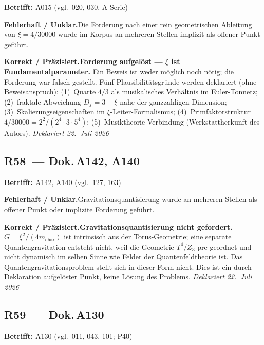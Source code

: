 \noindent\textbf{Betrifft:} A015 (vgl.\ 020, 030, A-Serie)


\smallskip\noindent\textbf{Fehlerhaft / Unklar.}\quad Die Forderung nach einer rein geometrischen Ableitung von $\xi=4/30000$ wurde im Korpus an mehreren Stellen implizit als offener Punkt geführt.


\smallskip\noindent\textbf{Korrekt / Präzisiert.}\quad \textbf{Forderung aufgelöst --- $\xi$ ist Fundamentalparameter.} Ein Beweis ist weder möglich noch nötig; die Forderung war falsch gestellt. Fünf Plausibilitätsgründe werden deklariert (ohne Beweisanspruch): (1)~Quarte $4/3$ als musikalisches Verhältnis im Euler-Tonnetz; (2)~fraktale Abweichung $D_f=3-\xi$ nahe der ganzzahligen Dimension; (3)~Skalierungseigenschaften im $\xi$-Leiter-Formalismus; (4)~Primfaktorstruktur $4/30000 = 2^2/(2^4\cdot 3\cdot 5^4)$; (5)~Musiktheorie-Verbindung (Werkstattherkunft des Autors). \emph{Deklariert 22.~Juli 2026}


\medskip


\subsection*{R58~--- Dok.\,A142, A140}

\noindent\textbf{Betrifft:} A142, A140 (vgl.\ 127, 163)


\smallskip\noindent\textbf{Fehlerhaft / Unklar.}\quad Gravitationsquantisierung wurde an mehreren Stellen als offener Punkt oder implizite Forderung geführt.


\smallskip\noindent\textbf{Korrekt / Präzisiert.}\quad \textbf{Gravitationsquantisierung nicht gefordert.} $G=\xi^2/(4m_\text{char})$ ist intrinsisch aus der Torus-Geometrie; eine separate Quantengravitation entsteht nicht, weil die Geometrie $T^4/Z_3$ pre-geordnet und nicht dynamisch im selben Sinne wie Felder der Quantenfeldtheorie ist. Das Quantengravitationsproblem stellt sich in dieser Form nicht. Dies ist ein durch Deklaration aufgelöster Punkt, keine Lösung des Problems. \emph{Deklariert 22.~Juli 2026}


\medskip


\subsection*{R59~--- Dok.\,A130}

\noindent\textbf{Betrifft:} A130 (vgl.\ 011, 043, 101; P40)


